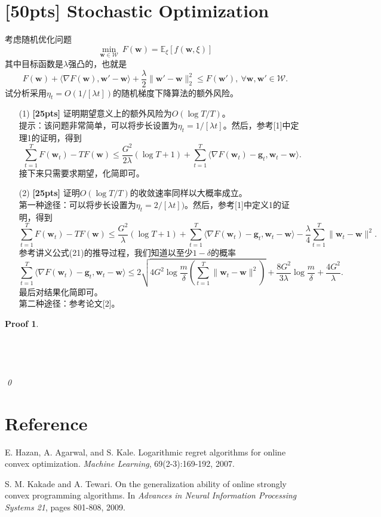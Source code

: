 \documentclass[a4paper,UTF8]{article}
\numberwithin{equation}{section}
\newtheorem*{myProof}{Proof}
\begin{document}
\newpage
\section{[50pts] Stochastic Optimization}
\noindent 考虑随机优化问题
\[
\min_{\mathbf{w} \in \mathcal{W}} \ F(\mathbf{w})= \mathbb{E}_{\xi} \left[ f(\mathbf{w}, \xi) \right]
\]
其中目标函数是$\lambda$强凸的，也就是
\begin{equation}\label{eqn:strong}
F(\mathbf{w}) + \langle \nabla F(\mathbf{w}), \mathbf{w}'-\mathbf{w}  \rangle + \frac{\lambda}{2} \|\mathbf{w}'-\mathbf{w}\|_2^2 \leq F(\mathbf{w}'), \ \forall \mathbf{w}, \mathbf{w}' \in \mathcal{W}.
\end{equation}
试分析采用$\eta_t=O(1/[\lambda t])$的随机梯度下降算法的额外风险。
\begin{enumerate}
  \item[(1)] \textbf{[25pts]} 证明期望意义上的额外风险为$O(\log T/T)$。\\
  提示：该问题非常简单，可以将步长设置为$\eta_t=1/[\lambda t]$。然后，参考[1]中定理1的证明，得到
\[
 \sum_{t=1}^T F(\mathbf{w}_{t}) - T F(\mathbf{w}) \leq \frac{G^2}{2 \lambda} (\log T+1) + \sum_{t=1}^T \langle \nabla F(\mathbf{w}_t)-\mathbf{g}_t, \mathbf{w}_t - \mathbf{w} \rangle.
\]
接下来只需要求期望，化简即可。
  \item[(2)] \textbf{[25pts]} 证明$O(\log T/T)$的收敛速率同样以大概率成立。\\
第一种途径：可以将步长设置为$\eta_t=2/[\lambda t])$。然后，参考[1]中定义1的证明，得到
\[
 \sum_{t=1}^T F(\mathbf{w}_{t}) - T F(\mathbf{w}) \leq    \frac{G^2}{\lambda}(\log T+1) +\sum_{t=1}^T \langle \nabla F(\mathbf{w}_t)-\mathbf{g}_t, \mathbf{w}_t - \mathbf{w} \rangle- \frac{\lambda}{4} \sum_{t=1}^T \|\mathbf{w}_t - \mathbf{w}\|^2.
\]
参考讲义公式(21)的推导过程，我们知道以至少$1-\delta$的概率
 \[
 \sum_{t=1}^T \langle \nabla F(\mathbf{w}_t)-\mathbf{g}_t, \mathbf{w}_t - \mathbf{w} \rangle \leq  2\sqrt{ 4 G^2  \log \frac{m }{\delta} \left( \sum_{t=1}^T \|\mathbf{w}_t - \mathbf{w}\|^2\right)} +  \frac{8G^2}{3\lambda}   \log \frac{m }{\delta} + \frac{4G^2}{\lambda} .
\]
最后对结果化简即可。\\
第二种途径：参考论文[2]。
\end{enumerate}
\begin{myProof}~\\
	~\\
	~\\
	~\\
	~\\	
	\qed
\end{myProof}
\newpage
\section*{Reference}
\begin{enumerate}[ {[}1{]}]
\item E. Hazan, A. Agarwal, and S. Kale. Logarithmic regret algorithms for online convex optimization. \textit{Machine Learning}, 69(2-3):169-192, 2007.
\item S. M. Kakade and A. Tewari. On the generalization ability of online strongly convex programming algorithms. In \textit{Advances in Neural Information Processing Systems 21}, pages 801-808, 2009.
\end{enumerate}
\end{document}
